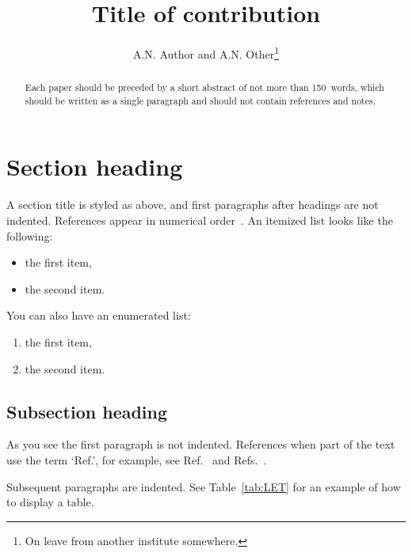 \documentclass{cernrep}
\begin{document}
\title{Title of contribution}
\author{A.N. Author and A.N. Other\thanks
                 {On leave from another institute somewhere.}}


\begin{abstract}
Each paper should be preceded by a short abstract of not more 
than 150~words, which should be written as a single paragraph 
and should not contain references and notes.
\end{abstract}


\maketitle

\section{Section heading}

A section title is styled as above, and first paragraphs after
headings are not indented. References appear in numerical
order~\cite{Raby1966,Dupont1961}. An itemized list looks like the following:
\begin{itemize}
\item the first item,
\item the second item.
\end{itemize}

You can also have an enumerated list:

\begin{enumerate}
\item the first item,
\item the second item.
\end{enumerate}

\subsection{Subsection heading}

As you see the first paragraph is not indented. References when part
      of the text use the term `Ref.', for example, see
      Ref.~\cite{Raby1966} and
      Refs.~\cite{Appleman1959,vanBerg1965,Bryant1985,Allen1977}.

Subsequent paragraphs are indented. See Table~\ref{tab:LET} for an
example of how to display a table.
\end{document}
